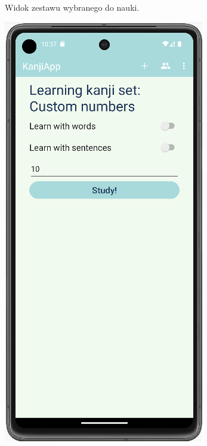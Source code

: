 \documentclass[a4paper,twoside,12pt]{book}
\begin{document}
\begin{figure}
\begin{subfigure}{0.3\textwidth}
    \caption{Widok zestawu wybranego do nauki.}
    \label{fig:list}
\end{subfigure}
\hfill
\begin{subfigure}{0.3\textwidth}
   \includegraphics[width=\textwidth]{learn/options}

\end{subfigure}
\end{figure}
\end{document}
